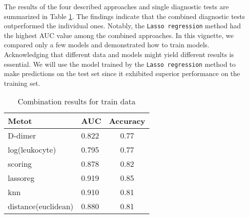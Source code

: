 \documentclass[10pt]{article}
\begin{document}
The results of the four described approaches and single diagnostic tests are summarized in Table \ref{tbl:Res}. The findings indicate that the combined diagnostic tests outperformed the individual ones. Notably, the \texttt{Lasso regression} method had the highest AUC value among the combined approaches. In this vignette, we compared only a few models and demonstrated how to train models. Acknowledging that different data and models might yield different results is essential. We will use the model trained by the \texttt{Lasso regression} method to make predictions on the test set since it exhibited superior performance on the training set.
\begin{table}[!ht]
\centering
\caption{Combination results for train data}
\label{tbl:Res}
\begin{tabular}{p{4cm}p{2cm}c}
\toprule
Metot & AUC & Accuracy \\
\midrule
D-dimer & 0.822 & 0.77 \\
log(leukocyte) & 0.795 & 0.77 \\
scoring & 0.878 & 0.82 \\
lassoreg & 0.919 & 0.85 \\
knn & 0.910 & 0.81 \\
distance(euclidean) & 0.880 & 0.81 \\
\bottomrule
\end{tabular}
\end{table}
\end{document}
